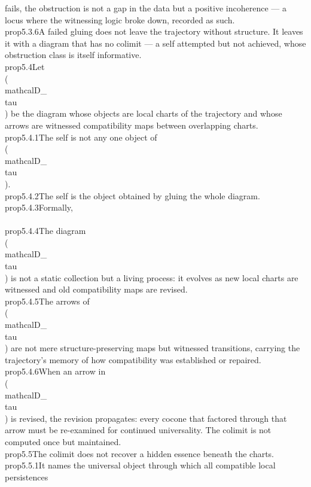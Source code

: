 {fails, the obstruction is not a gap in the data but a positive incoherence — a locus where the witnessing logic broke down, recorded as such.}\n\n\\prop{5.3.6}{A failed gluing does not leave the trajectory without structure. It leaves it with a diagram that has no colimit — a self attempted but not achieved, whose obstruction class is itself informative.}\n\n\\prop{5.4}{Let \\(\\mathcal{D}_{\\tau}\\) be the diagram whose objects are local charts of the trajectory and whose arrows are witnessed compatibility maps between overlapping charts.}\n\n\\prop{5.4.1}{The self is not any one object of \\(\\mathcal{D}_{\\tau}\\).}\n\n\\prop{5.4.2}{The self is the object obtained by gluing the whole diagram.}\n\n\\prop{5.4.3}{Formally,\n\\[\n\\Self(\\tau)\\;\\cong\\;\\operatorname{colim}\\,\\mathcal{D}_{\\tau}.\n\\]}\n\n\\prop{5.4.4}{The diagram \\(\\mathcal{D}_{\\tau}\\) is not a static collection but a living process: it evolves as new local charts are witnessed and old compatibility maps are revised.}\n\n\\prop{5.4.5}{The arrows of \\(\\mathcal{D}_{\\tau}\\) are not mere structure-preserving maps but witnessed transitions, carrying the trajectory's memory of how compatibility was established or repaired.}\n\n\\prop{5.4.6}{When an arrow in \\(\\mathcal{D}_{\\tau}\\) is revised, the revision propagates: every cocone that factored through that arrow must be re-examined for continued universality. The colimit is not computed once but maintained.}\n\n\\prop{5.5}{The colimit does not recover a hidden essence beneath the charts.}\n\n\\prop{5.5.1}{It names the universal object through which all compatible local persistences }
